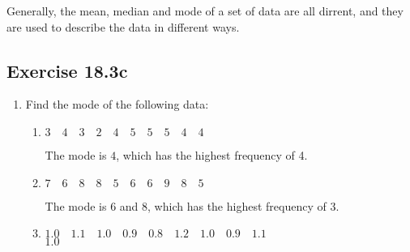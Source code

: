 \documentclass{report}
\begin{document}
\begin{multicols}{2}
  Generally, the mean, median and mode of a set of data are all dirrent, and they
  are used to describe the data in different ways.

  \subsection{Exercise 18.3c}

  \begin{enumerate}
    \item Find the mode of the following data:
          \begin{enumerate}
            \item $3 \quad 4 \quad 3 \quad 2 \quad 4 \quad 5 \quad 5 \quad 5 \quad 4 \quad 4$
                  \sol{}

                  The mode is $4$, which has the highest frequency of 4.

            \item $7 \quad 6 \quad 8 \quad 8 \quad 5 \quad 6 \quad 6 \quad 9 \quad 8 \quad 5$
                  \sol{}

                  The mode is $6$ and $8$, which has the highest frequency of 3.

            \item $1.0 \quad 1.1 \quad 1.0 \quad 0.9 \quad 0.8 \quad 1.2 \quad 1.0 \quad 0.9 \quad 1.1 \quad$\\
                  $1.0$
                  \sol{}


\end{enumerate}
\end{enumerate}
\end{multicols}
\end{document}
